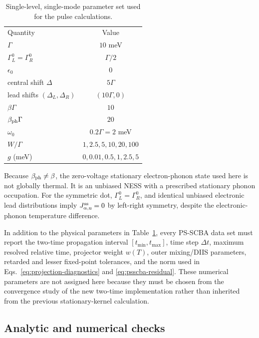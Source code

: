 \documentclass[
 reprint,
 superscriptaddress,
 amsmath,amssymb,
 aps,prb,
 longbibliography,
 floatfix
]{revtex4-2}
\begin{document}
\begin{table}[ht]
\caption{Single-level, single-mode parameter set used for the pulse
calculations.}
\label{tab:params}
\begin{ruledtabular}
\begin{tabular}{lc}
Quantity & Value\\
\colrule
$\Gamma$ & $10$ meV\\
$\Gamma_L^0=\Gamma_R^0$ & $\Gamma/2$\\
$\epsilon_0$ & $0$\\
central shift $\Delta$ & $5\Gamma$\\
lead shifts $(\Delta_L,\Delta_R)$ & $(10\Gamma,0)$\\
$\beta\Gamma$ & $10$\\
$\beta_{\rm ph}\Gamma$ & $20$\\
$\omega_0$ & $0.2\Gamma=2$ meV\\
$W/\Gamma$ & $1,2.5,5,10,20,100$\\
$g$ (meV) & $0,0.01,0.5,1,2.5,5$\\
\end{tabular}
\end{ruledtabular}
\end{table}

Because $\beta_{\rm ph}\neq\beta$, the zero-voltage stationary electron-phonon state used here is not globally thermal. It is an unbiased NESS with a prescribed stationary phonon occupation. For the symmetric dot, $\Gamma_L^0=\Gamma_R^0$, and identical unbiased electronic lead distributions imply $J_{\alpha,\mathrm u}^{\rm ss}=0$ by left-right symmetry, despite the electronic-phonon temperature difference.


In addition to the physical parameters in Table~\ref{tab:params}, every PS-SCBA data set must report the two-time propagation interval \([t_{\min},t_{\max}]\), time step \(\Delta t\), maximum resolved relative time, projector weight \(w(T)\), outer mixing/DIIS parameters, retarded and lesser fixed-point tolerances, and the norm used in Eqs.~\eqref{eq:projection-diagnostics} and \eqref{eq:psscba-residual}. These numerical parameters are not assigned here because they must be chosen from the convergence study of the new two-time implementation rather than inherited from the previous stationary-kernel calculation.



\subsection{Analytic and numerical checks}
\label{sec:model-limits}
\end{document}
